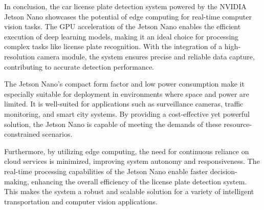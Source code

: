 In conclusion, the car license plate detection system powered by the NVIDIA Jetson Nano showcases the potential of edge computing for real-time computer vision tasks. The GPU acceleration of the Jetson Nano enables the efficient execution of deep learning models, making it an ideal choice for processing complex tasks like license plate recognition. With the integration of a high-resolution camera module, the system ensures precise and reliable data capture, contributing to accurate detection performance.

The Jetson Nano's compact form factor and low power consumption make it especially suitable for deployment in environments where space and power are limited. It is well-suited for applications such as surveillance cameras, traffic monitoring, and smart city systems. By providing a cost-effective yet powerful solution, the Jetson Nano is capable of meeting the demands of these resource-constrained scenarios.

Furthermore, by utilizing edge computing, the need for continuous reliance on cloud services is minimized, improving system autonomy and responsiveness. The real-time processing capabilities of the Jetson Nano enable faster decision-making, enhancing the overall efficiency of the license plate detection system. This makes the system a robust and scalable solution for a variety of intelligent transportation and computer vision applications.
